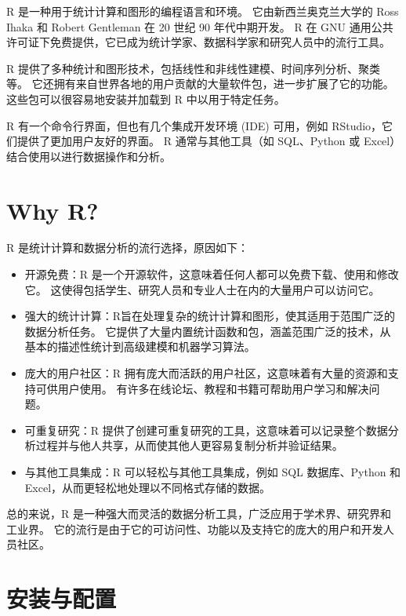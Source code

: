 \documentclass[
]{book}
\begin{document}
R 是一种用于统计计算和图形的编程语言和环境。 它由新西兰奥克兰大学的 Ross Ihaka 和 Robert Gentleman 在 20 世纪 90 年代中期开发。 R 在 GNU 通用公共许可证下免费提供，它已成为统计学家、数据科学家和研究人员中的流行工具。

R 提供了多种统计和图形技术，包括线性和非线性建模、时间序列分析、聚类等。 它还拥有来自世界各地的用户贡献的大量软件包，进一步扩展了它的功能。 这些包可以很容易地安装并加载到 R 中以用于特定任务。

R 有一个命令行界面，但也有几个集成开发环境 (IDE) 可用，例如 RStudio，它们提供了更加用户友好的界面。 R 通常与其他工具（如 SQL、Python 或 Excel）结合使用以进行数据操作和分析。

\hypertarget{why-r}{%
\section{Why R?}\label{why-r}}

R 是统计计算和数据分析的流行选择，原因如下：

\begin{itemize}
\item
  开源免费：R 是一个开源软件，这意味着任何人都可以免费下载、使用和修改它。 这使得包括学生、研究人员和专业人士在内的大量用户可以访问它。
\item
  强大的统计计算：R旨在处理复杂的统计计算和图形，使其适用于范围广泛的数据分析任务。 它提供了大量内置统计函数和包，涵盖范围广泛的技术，从基本的描述性统计到高级建模和机器学习算法。
\item
  庞大的用户社区：R 拥有庞大而活跃的用户社区，这意味着有大量的资源和支持可供用户使用。 有许多在线论坛、教程和书籍可帮助用户学习和解决问题。
\item
  可重复研究：R 提供了创建可重复研究的工具，这意味着可以记录整个数据分析过程并与他人共享，从而使其他人更容易复制分析并验证结果。
\item
  与其他工具集成：R 可以轻松与其他工具集成，例如 SQL 数据库、Python 和 Excel，从而更轻松地处理以不同格式存储的数据。
\end{itemize}

总的来说，R 是一种强大而灵活的数据分析工具，广泛应用于学术界、研究界和工业界。 它的流行是由于它的可访问性、功能以及支持它的庞大的用户和开发人员社区。

\hypertarget{ux5b89ux88c5ux4e0eux914dux7f6e}{%
\section{安装与配置}\label{ux5b89ux88c5ux4e0eux914dux7f6e}}
\end{document}
